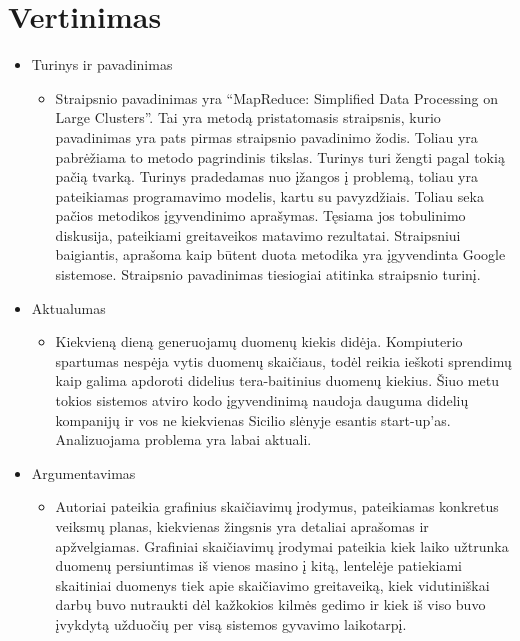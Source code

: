 \documentclass[10pt, onecolumn]{IEEEtran}
\begin{document}
	\section{Vertinimas}

		\begin{itemize}
		\item Turinys ir pavadinimas
	        \begin{itemize}
	          \item Straipsnio pavadinimas yra ``MapReduce: Simplified Data Processing on Large Clusters''. Tai yra metodą pristatomasis straipsnis, kurio pavadinimas yra pats pirmas straipsnio pavadinimo žodis. Toliau yra pabrėžiama to metodo pagrindinis tikslas. Turinys turi žengti pagal tokią pačią tvarką.
	          Turinys pradedamas nuo įžangos į problemą, toliau yra pateikiamas programavimo modelis, kartu su pavyzdžiais. Toliau seka pačios metodikos įgyvendinimo aprašymas. Tęsiama jos tobulinimo diskusija, pateikiami greitaveikos matavimo rezultatai. Straipsniui baigiantis, aprašoma kaip būtent duota metodika yra įgyvendinta Google sistemose.
	          Straipsnio pavadinimas tiesiogiai atitinka straipsnio turinį.
	        \end{itemize}
	      \item Aktualumas
	        \begin{itemize}
	          \item Kiekvieną dieną generuojamų duomenų kiekis didėja. Kompiuterio spartumas nespėja vytis duomenų skaičiaus, todėl reikia ieškoti sprendimų kaip galima apdoroti didelius tera-baitinius duomenų kiekius. Šiuo metu tokios sistemos atviro kodo įgyvendinimą naudoja dauguma didelių kompanijų ir vos ne kiekvienas Sicilio slėnyje esantis start-up'as. Analizuojama problema yra labai aktuali.
	        \end{itemize}
	      \item Argumentavimas
	        \begin{itemize}
	          \item Autoriai pateikia grafinius skaičiavimų įrodymus, pateikiamas konkretus veiksmų planas, kiekvienas žingsnis yra detaliai aprašomas ir apžvelgiamas. Grafiniai skaičiavimų įrodymai pateikia kiek laiko užtrunka duomenų persiuntimas iš vienos masino į kitą, lentelėje patiekiami skaitiniai duomenys tiek apie skaičiavimo greitaveiką, kiek vidutiniškai darbų buvo nutraukti dėl kažkokios kilmės gedimo ir kiek iš viso buvo įvykdytą užduočių per visą sistemos gyvavimo laikotarpį.
	        \end{itemize}

\end{itemize}
\end{document}
